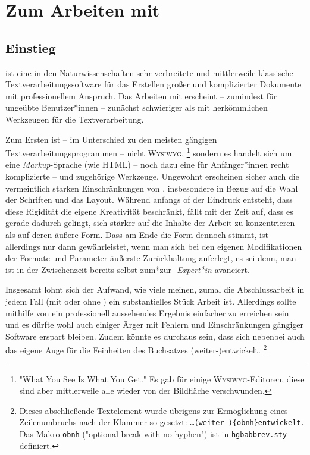 \chapter{Zum Arbeiten mit \latex}
\label{cha:ArbeitenMitLatex}


\section{Einstieg}
\label{sec:LatexEinstieg}

\latex ist eine in den Naturwissenschaften sehr verbreitete und mittlerweile
klassische Textverarbeitungssoftware für das Erstellen großer und
komplizierter Dokumente mit professionellem Anspruch. Das Arbeiten mit \latex
erscheint -- zumindest für ungeübte Benutzer*innen -- zunächst schwieriger
als mit herkömmlichen Werkzeugen für die Textverarbeitung.

Zum Ersten ist -- im Unterschied zu den meisten gängigen
Text\-ver\-arbei\-tungs\-prog\-ram\-men -- \latex nicht \textsc{Wysiwyg},%
\footnote{"What You See Is What You Get." Es gab für \latex einige
\textsc{Wysiwyg}-Editoren, diese sind aber mittlerweile alle wieder von der
Bildfläche verschwunden.}
sondern es handelt sich um eine \emph{Markup}-Sprache (wie HTML) -- noch
dazu eine für Anfänger*innen recht komplizierte -- und zugehörige Werkzeuge.
Ungewohnt erscheinen sicher auch die vermeintlich starken Einschränkungen von
\latex, insbesondere in Bezug auf die Wahl der Schriften und das Layout.
Während anfangs of der Eindruck entsteht, dass diese Rigidität die eigene
Kreativität beschränkt, fällt mit der Zeit auf, dass es gerade dadurch
gelingt, sich stärker auf die Inhalte der Arbeit zu konzentrieren als auf
deren äußere Form. Dass am Ende die Form dennoch stimmt, ist allerdings nur
dann gewährleistet, wenn man sich bei den eigenen Modifikationen der Formate
und Parameter äußerste Zurückhaltung auferlegt, es sei denn, man ist in der
Zwischenzeit bereits selbst zum*zur \latex-\emph{Expert*in} avanciert.

Insgesamt lohnt sich der Aufwand, wie viele meinen, zumal die Abschlussarbeit
in jedem Fall (mit oder ohne \latex) ein substantielles Stück Arbeit ist.
Allerdings sollte mithilfe von \latex ein professionell aussehendes Ergebnis
einfacher zu erreichen sein und es dürfte wohl auch einiger Ärger mit Fehlern
und Einschränkungen gängiger Software erspart bleiben. Zudem könnte es
durchaus sein, dass sich nebenbei auch das eigene Auge für die Feinheiten des
Buchsatzes (weiter-){\obnh}entwickelt.%
\footnote{Dieses abschließende Textelement wurde übrigens zur Ermöglichung
eines Zeilenumbruchs nach der Klammer so gesetzt:
\texttt{\ldots (weiter-)\{{\bs}obnh\}entwickelt.} Das Makro
\texttt{{\bs}obnh} ("optional break with no hyphen") ist in
\texttt{hgbabbrev.sty} definiert.}

